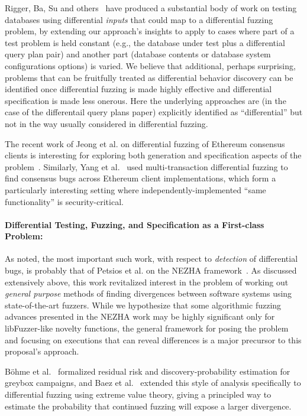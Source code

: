 Rigger, Ba, Su and others~\cite{Rigger2020PQS,Rigger2020TLP,Ba2024DQP} have
produced a substantial body of work on testing databases using
differential \emph{inputs} that could map to a differential fuzzing
problem, by extending our approach's insights to apply to cases where
part of a test problem is held constant (e.g., the database under test
plus a differential query plan pair) and another part (database
contents or database system configurations options) is varied.  We
believe that additional, perhaps surprising, problems that can be
fruitfully treated as differential
behavior discovery can be identified once differential fuzzing is made
highly effective and differential specification is made less onerous.
Here the underlying approaches are (in the case of the differentail
query plans paper) explicitly identified as ``differential'' but not
in the way usually considered in differential fuzzing.

The recent work of Jeong et al. on differential fuzzing of Ethereum
consensus clients is interesting for exploring both generation and
specification aspects of the problem~\cite{Jeong2026SpecTrum}.
Similarly, Yang et al.~\cite{yang2021consensus} used multi-transaction
differential fuzzing to find consensus bugs across Ethereum client
implementations, which form a particularly interesting setting where independently-implemented ``same functionality'' is security-critical.

\paragraph{Differential Testing, Fuzzing, and Specification as a First-class Problem:}
As noted, the most important such work, with respect to \emph{detection} of
differential bugs, is probably that of Petsios et
al. on the NEZHA framework~\cite{nezha}.  As discussed extensively
above, this work revitalized interest in the problem of working out
\emph{general purpose} methods of finding divergences between software
systems using state-of-the-art fuzzers.  While we hypothesize that
some algorithmic
fuzzing advances presented in the NEZHA work may be highly significant
only for
libFuzzer-like novelty functions, the general
framework for posing the problem and focusing on executions that can
reveal differences is a major precursor to this proposal's approach.

Böhme et al.~\cite{bohme2021residual} formalized residual risk and
discovery-probability estimation for greybox campaigns, and Baez et
al.~\cite{baez2025evt} extended this style of analysis specifically to
differential fuzzing using extreme value theory, giving a principled
way to estimate the probability that continued fuzzing will expose a
larger divergence.

